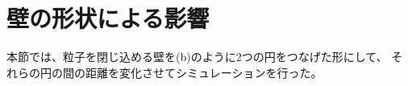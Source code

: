 \documentclass[/Users/ikedahajime/GitHub/reserch/master_report/thesis]{subfiles}
\begin{document}
\section{壁の形状による影響}\label{sec:res_abp_twowall}
本節では、粒子を閉じ込める壁を(b)のように2つの円をつなげた形にして、
それらの円の間の距離を変化させてシミュレーションを行った。
\end{document}
